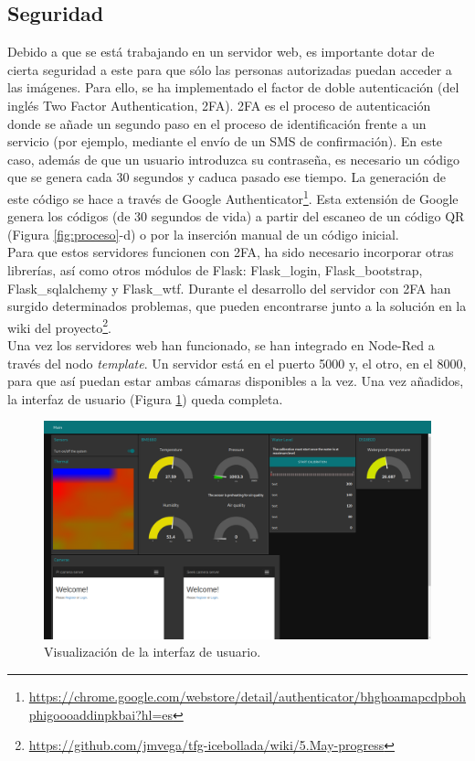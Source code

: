 \subsection{Seguridad}
Debido a que se está trabajando en un servidor web, es importante dotar de cierta seguridad a este para que sólo las personas autorizadas puedan acceder a las imágenes. Para ello, se ha implementado el factor de doble autenticación (del inglés Two Factor Authentication, 2FA). 2FA es el proceso de autenticación donde se añade un segundo paso en el proceso de identificación frente a un servicio (por ejemplo, mediante el envío de un SMS de confirmación). En este caso, además de que un usuario introduzca su contraseña, es necesario un código que se genera cada 30 segundos y caduca pasado ese tiempo. La generación de este código se hace a través de Google Authenticator\footnote{\url{https://chrome.google.com/webstore/detail/authenticator/bhghoamapcdpbohphigoooaddinpkbai?hl=es}}. Esta extensión de Google genera los códigos (de 30 segundos de vida) a partir del escaneo de un código QR (Figura \ref{fig:proceso}-d) o por la inserción manual de un código inicial.\\

Para que estos servidores funcionen con 2FA, ha sido necesario incorporar otras librerías, así como otros módulos de Flask: Flask\_login, Flask\_bootstrap, Flask\_sqlalchemy y Flask\_wtf. Durante el desarrollo del servidor con 2FA han surgido determinados problemas, que pueden encontrarse junto a la solución en la wiki del proyecto\footnote{\url{https://github.com/jmvega/tfg-icebollada/wiki/5.May-progress}}.\\

Una vez los servidores web han funcionado, se han integrado en Node-Red a través del nodo \textit{template}. Un servidor está en el puerto 5000 y, el otro, en el 8000, para que así puedan estar ambas cámaras disponibles a la vez. Una vez añadidos, la interfaz de usuario (Figura \ref{fig:UIcompleta}) queda completa.\\
\begin{figure} [h!]
  \begin{center}
    \includegraphics[width=16cm]{figs/UIcompleta}
  \end{center}
  \caption{Visualización de la interfaz de usuario.}
  \label{fig:UIcompleta}
\end{figure}

